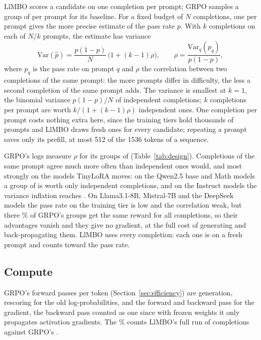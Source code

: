 \documentclass[twoside]{article}
\newcommand{\llmbo}{LlMBO}
\begin{document}
\llmbo{} scores a candidate on one completion per prompt; GRPO samples a group of \grpoGroup{} per prompt for its baseline. For a fixed budget of $N$ completions, one per prompt gives the more precise estimate of the pass rate $p$. With $k$ completions on each of $N/k$ prompts, the estimate has variance
\[
\mathrm{Var}(\hat p) = \frac{p(1 - p)}{N}\,\bigl(1 + (k - 1)\rho\bigr), \qquad \rho = \frac{\mathrm{Var}_q(p_q)}{p(1 - p)},
\]
where $p_q$ is the pass rate on prompt $q$ and $\rho$ the correlation between two completions of the same prompt: the more prompts differ in difficulty, the less a second completion of the same prompt adds. The variance is smallest at $k = 1$, the binomial variance $p(1 - p)/N$ of independent completions; $k$ completions per prompt are worth $k / (1 + (k - 1)\rho)$ independent ones. One completion per prompt costs nothing extra here, since the training tiers hold thousands of prompts and \llmbo{} draws fresh ones for every candidate; repeating a prompt saves only its prefill, at most 512 of the 1536 tokens of a sequence.

GRPO's logs measure $\rho$ for its groups of \grpoGroup{} (Table~\ref{tab:design}). Completions of the same prompt agree much more often than independent ones would, and most strongly on the models TinyLoRA moves: on the Qwen2.5 base and Math models a group of \grpoGroup{} is worth only \designEffectiveQwen{} independent completions, and on the Instruct models the variance inflation reaches \designEffectMax{}. On Llama3.1-8B, Mistral-7B and the DeepSeek models the pass rate on the training tier is low and the correlation weak, but there \designEqualOthers{}\% of GRPO's groups get the same reward for all \grpoGroup{} completions, so their advantages vanish and they give no gradient, at the full cost of generating and back-propagating them. \llmbo{} uses every completion: each one is on a fresh prompt and counts toward the pass rate.

\subsection{Compute}
\label{sec:compute}
GRPO's \grpoPasses{} forward passes per token (Section~\ref{sec:efficiency}) are generation, rescoring for the old log-probabilities, and the forward and backward pass for the gradient, the backward pass counted as one since with frozen weights it only propagates activation gradients. The \boComputeShare{}\% counts \llmbo{}'s full run of \boCompletions{} completions against GRPO's \grpoCompletions{}.
\end{document}
